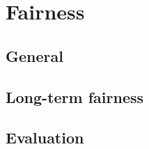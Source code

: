 \chapter{Fairness} \label{chap:fairness}

\section{General}

\section{Long-term fairness}

\section{Evaluation}